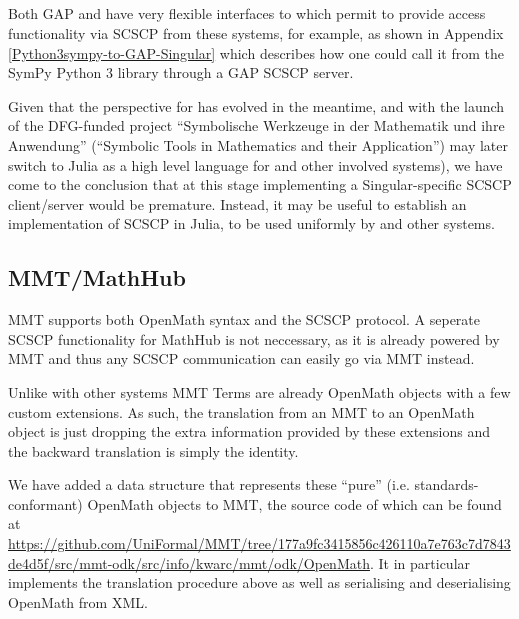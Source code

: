 \documentclass{deliverablereport}
\begin{document}
\subsection{\Singular}

Both GAP and \Sage have very flexible interfaces to \Singular
which permit to provide access \Singular functionality via SCSCP
from these systems, for example, as shown in 
Appendix \ref{Python3sympy-to-GAP-Singular} which 
describes how one could call it from the SymPy Python 3 library 
through a GAP SCSCP server.


Given that the perspective for \Singular has evolved in the meantime,
and with the launch of the DFG-funded project 
``Symbolische Werkzeuge in der Mathematik und ihre Anwendung''
(``Symbolic Tools in Mathematics and their Application'')
\Singular may later switch to Julia as a high level language 
for \Singular and other involved systems), we have come to the
conclusion that at this stage implementing a Singular-specific
SCSCP client/server would be premature. Instead, it may be useful
to establish an implementation of SCSCP in Julia, to be used 
uniformly by \Singular and other systems.


\subsection{MMT/MathHub}

MMT supports both OpenMath syntax and the SCSCP protocol. A seperate SCSCP
functionality for MathHub is not neccessary, as it is already powered by MMT and
thus any SCSCP communication can easily go via MMT instead.

Unlike with other systems MMT Terms are already OpenMath objects with a few
custom extensions. As such, the translation from an MMT to an OpenMath object
is just dropping the extra information provided by these extensions and the
backward translation is simply the identity.

We have added a data structure that represents these ``pure''
(i.e. standards-conformant) OpenMath objects to MMT, the source code of
which can be found at
\url{https://github.com/UniFormal/MMT/tree/177a9fc3415856c426110a7e763c7d7843de4d5f/src/mmt-odk/src/info/kwarc/mmt/odk/OpenMath}.
It in particular implements the translation procedure above as well as
serialising and deserialising OpenMath from XML.
\end{document}
